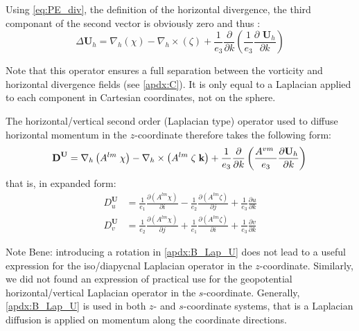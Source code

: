 \documentclass[../main/NEMO_manual]{subfiles}
\begin{document}
Using \autoref{eq:PE_div}, the definition of the horizontal divergence,
the third componant of the second vector is obviously zero and thus :
\[
  \Delta {\textbf{U}}_h = \nabla _h \left( \chi \right) - \nabla _h \times \left( \zeta \right) + \frac {1}{e_3 } \frac {\partial }{\partial k} \left( {\frac {1}{e_3 } \frac{\partial {\textbf{ U}}_h }{\partial k}} \right)
\]

Note that this operator ensures a full separation between
the vorticity and horizontal divergence fields (see \autoref{apdx:C}).
It is only equal to a Laplacian applied to each component in Cartesian coordinates, not on the sphere.

The horizontal/vertical second order (Laplacian type) operator used to diffuse horizontal momentum in
the $z$-coordinate therefore takes the following form:
\begin{equation}
  \label{apdx:B_Lap_U}
  {
    \textbf{D}}^{\textbf{U}} =
  \nabla _h \left( {A^{lm}\;\chi } \right)
  - \nabla _h \times \left( {A^{lm}\;\zeta \;{\textbf{k}}} \right)
  + \frac{1}{e_3 }\frac{\partial }{\partial k}\left( {\frac{A^{vm}\;}{e_3 }
      \frac{\partial {\rm {\bf U}}_h }{\partial k}} \right) \\
\end{equation}
that is, in expanded form:
\begin{align*}
  D^{\textbf{U}}_u
  & = \frac{1}{e_1} \frac{\partial \left( {A^{lm}\chi   } \right)}{\partial i}
    -\frac{1}{e_2} \frac{\partial \left( {A^{lm}\zeta } \right)}{\partial j}
    +\frac{1}{e_3} \frac{\partial u}{\partial k}      \\
  D^{\textbf{U}}_v
  & = \frac{1}{e_2 }\frac{\partial \left( {A^{lm}\chi   } \right)}{\partial j}
    +\frac{1}{e_1 }\frac{\partial \left( {A^{lm}\zeta } \right)}{\partial i}
    +\frac{1}{e_3} \frac{\partial v}{\partial k}
\end{align*}

Note Bene: introducing a rotation in \autoref{apdx:B_Lap_U} does not lead to
a useful expression for the iso/diapycnal Laplacian operator in the $z$-coordinate.
Similarly, we did not found an expression of practical use for
the geopotential horizontal/vertical Laplacian operator in the $s$-coordinate.
Generally, \autoref{apdx:B_Lap_U} is used in both $z$- and $s$-coordinate systems,
that is a Laplacian diffusion is applied on momentum along the coordinate directions.

\biblio
\end{document}
